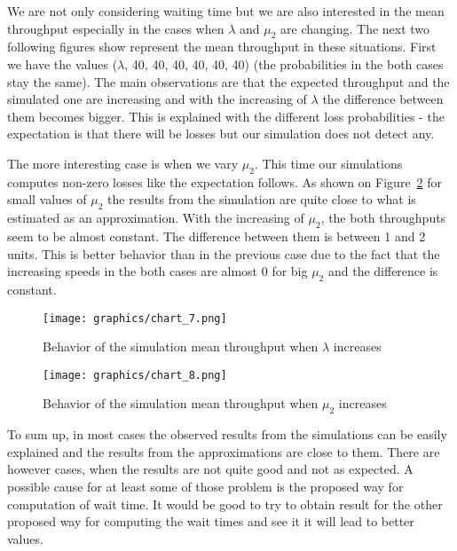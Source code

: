 \documentclass[12pt]{article}
\theoremstyle{plain}
\begin{document}
We are not only considering waiting time but we are also interested in the mean
throughput especially in the cases when $\lambda$ and $\mu_2$ are changing.
The next two following figures show represent the mean throughput in these situations.
First we have the values ($\lambda$, 40, 40, 40, 40, 40, 40) (the probabilities in
the both cases stay the same). The main observations are that the expected throughput
and the simulated one are increasing and with the increasing of $\lambda$ the
difference between them becomes bigger. This is explained with the different loss
probabilities - the expectation is that there will be losses but our simulation
does not detect any.

The more interesting case is when we vary $\mu_2$. This time our simulations
computes non-zero losses like the expectation follows. As shown on Figure~\ref{fig:throughput2}
for small values of $\mu_2$ the results from the simulation are quite close to
what is estimated as an approximation. With the increasing of $\mu_2$, the both
throughputs seem to be almost constant. The difference between them is between 1
and 2 units. This is better behavior than in the previous case due to the fact
that the increasing speeds in the both cases are almost 0 for big $\mu_2$ and the
difference is constant.

\begin{figure}[h]
  \caption{Behavior of the simulation mean throughput when $\lambda$ increases}
  \texttt{[image: graphics/chart\_7.png]}\\
  \label{fig:throughput1}
\end{figure}

\begin{figure}[h]
  \caption{Behavior of the simulation mean throughput when $\mu_2$ increases}
  \texttt{[image: graphics/chart\_8.png]}\\
  \label{fig:throughput2}
\end{figure}

To sum up, in most cases the observed results from the simulations can be easily
explained and the results from the approximations are close to them. There are
however cases, when the results are not quite good and not as expected. A
possible cause for at least some of those problem is the proposed way for
computation of wait time. It would be good to try to obtain result for the other
proposed way for computing the wait times and see it it will lead to better
values.
\end{document}

